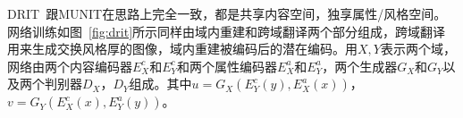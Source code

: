 





DRIT~\cite{lee2018diverse}跟MUNIT在思路上完全一致，都是共享内容空间，独享属性/风格空间。网络训练如图~\ref{fig:drit}所示同样由域内重建和跨域翻译两个部分组成，跨域翻译用来生成交换风格厚的图像，域内重建被编码后的潜在编码。用$X, Y$表示两个域，网络由两个内容编码器$E_{X}^{c}$和$E_{Y}^{c}$和两个属性编码器$E_{X}^{a}$和$E_{Y}^{a}$，两个生成器$G_X$和$G_Y$以及两个判别器$D_X$，$D_Y$组成。其中$u=G_X(E_Y^c(y),E_X^a(x))$，$v=G_Y(E_X^c(x),E_Y^a(y))$。

